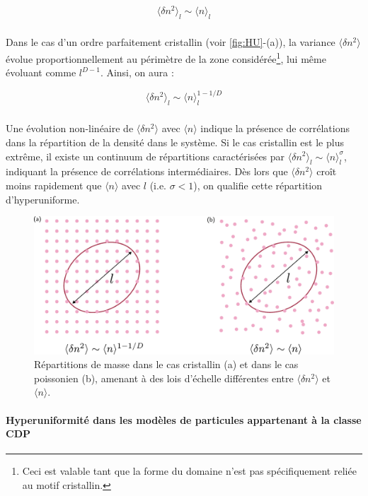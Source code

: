 \begin{equation}
	\langle \delta n^2 \rangle_l \sim \langle n \rangle_l
\end{equation} 

\subparagraph{}Dans le cas d'un ordre parfaitement cristallin (voir \autoref{fig:HU}-(a)), la variance $\langle \delta n^2 \rangle$ évolue proportionnellement au périmètre de la zone considérée\footnote{Ceci est valable tant que la forme du domaine n'est pas spécifiquement reliée au motif cristallin.}, lui même évoluant comme $l^{D-1}$. Ainsi, on aura :

\begin{equation}
	\langle \delta n^2 \rangle_l \sim \langle n \rangle_l^{1-1/D}
\end{equation} 

\subparagraph{}Une évolution non-linéaire de $\langle \delta n^2 \rangle$ avec $\langle n \rangle$ indique la présence de corrélations dans la répartition de la densité dans le système. Si le cas cristallin est le plus extrême, il existe un continuum de répartitions caractérisées par $\langle \delta n^2 \rangle_l \sim \langle n \rangle_l^{\sigma}$, indiquant la présence de corrélations intermédiaires. Dès lors que $\langle \delta n^2 \rangle$ croît moins rapidement que $\langle n \rangle$ avec $l$ (i.e. $\sigma < 1$), on qualifie cette répartition d'hyperuniforme.

\begin{figure}[h]
	\centering
	\includegraphics[width=\textwidth]{Chapitre1/Figures/CDP/hyperuniformite.pdf}
	\caption{Répartitions de masse dans le cas cristallin (a) et dans le cas poissonien (b), amenant à des lois d'échelle différentes entre $\langle \delta n^2 \rangle$ et $\langle n \rangle$.}
	\label{fig:HU}
\end{figure}

\paragraph{Hyperuniformité dans les modèles de particules appartenant à la classe CDP}

